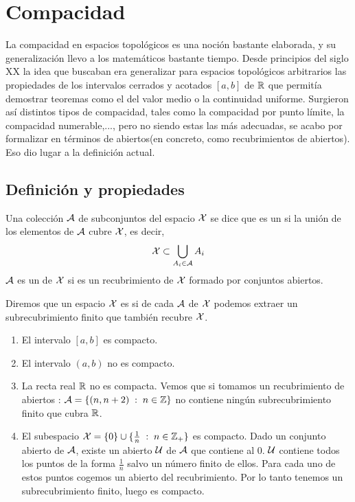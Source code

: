 \chapter{Compacidad}
\label{comp}

La compacidad en espacios topológicos es una noción bastante elaborada, y su generalización llevo a los matemáticos bastante tiempo. Desde principios del siglo XX la idea que buscaban era generalizar para espacios topológicos arbitrarios las propiedades de los intervalos cerrados y acotados $[a,b]$ de $\mathbb{R}$ que permitía demostrar teoremas como el del valor medio o la continuidad uniforme. Surgieron así distintos tipos de compacidad, tales como la compacidad por punto límite, la compacidad numerable,...,  pero no siendo estas las más adecuadas, se acabo por formalizar en términos de abiertos(en concreto, como recubrimientos de abiertos). Eso dio lugar a la definición actual.

\section{Definición y propiedades}

\begin{defi}
	Una colección $\mathcal{A}$ de subconjuntos del espacio $\mathcal{X}$ se dice que es un  si la unión de los elementos de $\mathcal{A}$ cubre $\mathcal{X}$, es decir, $$\mathcal{X} \subset \bigcup_{A_i \in \mathcal{A}}A_i$$ $\mathcal{A}$ es un  de $\mathcal{X}$ si es un recubrimiento de $\mathcal{X}$ formado por conjuntos abiertos.
\end{defi}

\begin{defi}[Compacto]
	Diremos que un espacio $\mathcal{X}$ es  si de cada  $\mathcal{A}$ de $\mathcal{X}$ podemos extraer un subrecubrimiento finito que también recubre $\mathcal{X}$.
\end{defi}

\begin{exa}
	\begin{enumerate}
		\item El intervalo $[a,b]$ es compacto.
		\item El intervalo $(a,b)$ no es compacto.
		\item La recta real $\mathbb{R}$ no es compacta. Vemos que si tomamos un recubrimiento de abiertos : $\mathcal{A}=\{(n,n+2) \;:\; n \in \mathbb{Z}\}$ no contiene ningún subrecubrimiento finito que cubra $\mathbb{R}$.
		\item El subespacio $\mathcal{X} = \{0\} \cup \{\frac{1}{n} \;:\; n \in \mathbb{Z}_{+}\}$ es compacto.
		Dado un conjunto abierto de $\mathcal{A}$, existe un abierto $\mathcal{U}$ de $\mathcal{A}$ que contiene al $0$. $\mathcal{U}$ contiene todos los puntos de la forma $\frac{1}{n}$ salvo un número finito de ellos. Para cada uno de estos puntos cogemos un abierto del recubrimiento. Por lo tanto tenemos un subrecubrimiento finito, luego es compacto. 
	\end{enumerate}
\end{exa}


